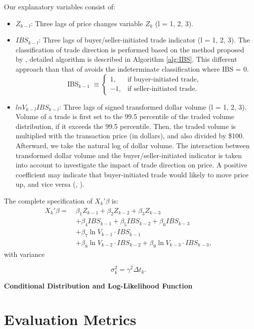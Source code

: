 Our explanatory variables consist of:
\begin{itemize}
    \item $Z_{k-l}$: Three lags of price changes variable $Z_k$ (l = 1, 2, 3).
    \item $IBS_{k-l}$: Three lags of buyer/seller-initiated trade indicator (l = 1, 2, 3). The classification of trade direction is performed based on the method proposed by \citet{leeready1991}, detailed algorithm is described in Algorithm \ref{alg:IBS}. This different approach than that of \citet{hausman1992} avoids the indeterminate classification where IBS = 0.
    \begin{equation}
\mathrm{IBS}_{k-1} \;\equiv
\begin{cases}
1,  & \text{if buyer-initiated trade},\\
-1, & \text{if seller-initiated trade}.
\end{cases}
\label{eq:5}
\end{equation}
    
       \item$lnV_{k-l}IBS_{k-l}$: Three lags of signed transformed dollar volume (l = 1, 2, 3). Volume of a trade is first set to the 99.5 percentile of the traded volume distribution, if it exceeds the 99.5 percentile. Then, the traded volume is multiplied with the transaction price (in dollars), and also divided by \$100. Afterward, we take the natural log of dollar volume. 
       The interaction between transformed dollar volume and the buyer/seller-initiated indicator is taken into account to investigate the impact of trade direction on price. A positive coefficient may indicate that buyer-initiated trade would likely to move price up, and vice versa (\citet{hausman1992}, \citet{easleyohara1987}).
\end{itemize}

The complete specification of \(X_k' \beta\) is:
\begin{align}
X_k' \beta =\ & \beta_1 Z_{k-1} + \beta_2 Z_{k-2} + \beta_3 Z_{k-3} \nonumber \\
& + \beta_4 IBS_{k-1} + \beta_5 IBS_{k-2} + \beta_6 IBS_{k-3} \nonumber \\
& + \beta_7 \ln V_{k-1} \cdot IBS_{k-1} \nonumber \\
& + \beta_8 \ln V_{k-2} \cdot IBS_{k-2} + \beta_9 \ln V_{k-3} \cdot IBS_{k-3}, \label{eq:6}
\end{align}
with variance 

\begin{equation}
\sigma_k^2 = \gamma^2 \Delta t_k.
\label{eq:7}
\end{equation}

{\noindent\bfseries Conditional Distribution and Log-Likelihood Function}











\section{Evaluation Metrics}